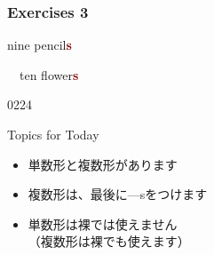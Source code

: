 \documentclass[aspectratio=169,xcolor={dvipsnames,table}]{beamer}
\newcommand{\myaudio}[1]{\href{#1}{\faVolumeUp}}
\begin{document}
\begin{frame}[plain]\frametitle{Exercises 3}

\hspace{20pt}%
\pause
{}\hspace{15pt}
\pause

\mbox{}\hfill{\large nine pencil\textcolor{Maroon}{\bfseries s}}
\pause

\bigskip

\bigskip


\bcfleur\,\,\,\,\hspace{45pt}%
\pause
\bcfleur\bcfleur\bcfleur\bcfleur\bcfleur\hspace{15pt}
\bcfleur\bcfleur\bcfleur\bcfleur\bcfleur\hspace{10pt}
\pause
\hfill{\large ten flower\textcolor{Maroon}{\bfseries s}}

\hfill{\tiny 0224}\,{\scriptsize \myaudio{./audio/005_singular_plural_03.mp3}}

\pause
\begin{block}{Topics for Today}\small
 \begin{itemize}[square]
  \item 単数形と複数形があります
  \item 複数形は、最後に---sをつけます
  \item 単数形は裸では使えません\,\,\dbend\\
（複数形は裸でも使えます）
 \end{itemize}
     \end{block}
\end{frame}
\end{document}

